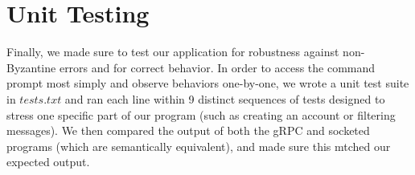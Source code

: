 \documentclass[
	a4paper, %
	10pt, %
	unnumberedsections, %
	twoside, %
]{LTJournalArticle}
\begin{document}
\section{Unit Testing}
Finally, we made sure to test our application for robustness against non-Byzantine errors and for correct behavior. In order to access the command prompt most simply and observe behaviors one-by-one, we wrote a unit test suite in $tests.txt$ and ran each line within 9 distinct sequences of tests designed to stress one specific part of our program (such as creating an account or filtering messages). We then compared the output of both the gRPC and socketed programs (which are semantically equivalent), and made sure this mtched our expected output.
\end{document}
